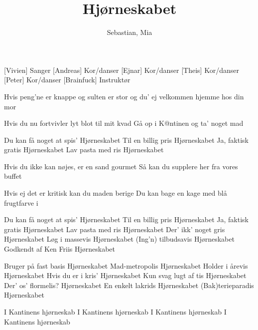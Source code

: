 \documentclass[a4paper,11pt]{article}
\title{Hjørneskabet}
\author{Sebastian, Mia}
\begin{document}
\maketitle

\begin{roles}
[Vivien] Sanger
[Andreas] Kor/danser
[Ejnar] Kor/danser
[Theis] Kor/danser
[Peter] Kor/danser
[Brainfuck] Instruktør
\end{roles}

\begin{song}
   Hvis peng'ne er knappe
            og sulten er stor
            og du' ej velkommen
            hjemme hos din mor

            Hvis du nu fortvivler
            lyt blot til mit kvad
            Gå op i K@ntinen
            og ta' noget mad

            Du kan få noget at spis'
            Hjørneskabet
            Til en billig pris
            Hjørneskabet
            Ja, faktisk gratis
            Hjørneskabet
            Lav pasta med ris
            Hjørneskabet

            Hvis du ikke kan nøjes,
            er en sand gourmet
            Så kan du supplere
            her fra vores buffet

            Hvis ej det er kritisk
            kan du maden berige
            Du kan bage en kage
            med blå frugtfarve i

            Du kan få noget at spis'
            Hjørneskabet
            Til en billig pris
            Hjørneskabet
            Ja, faktisk gratis
            Hjørneskabet
            Lav pasta med ris
            Hjørneskabet
            Der' ikk' noget gris
            Hjørneskabet
            Løg i massevis
            Hjørneskabet
            (Ing'n) tilbudsavis
            Hjørneskabet
            Godkendt af Ken Friis
            Hjørneskabet


            Bruger på fast basis
            Hjørneskabet
            Mad-metropolis
            Hjørneskabet
            Holder i årevis
            Hjørneskabet
            Hvis du er i kris'
            Hjørneskabet
            Kun svag lugt af tis
            Hjørneskabet
            Der' os' flormelis?
            Hjørneskabet
            En enkelt lakrids
            Hjørneskabet
            (Bak)terieparadis
            Hjørneskabet

            I Kantinens hjørneskab
            I Kantinens hjørneskab
            I Kantinens hjørneskab
            I Kantinens hjørneskab


\end{song}
\end{document}
